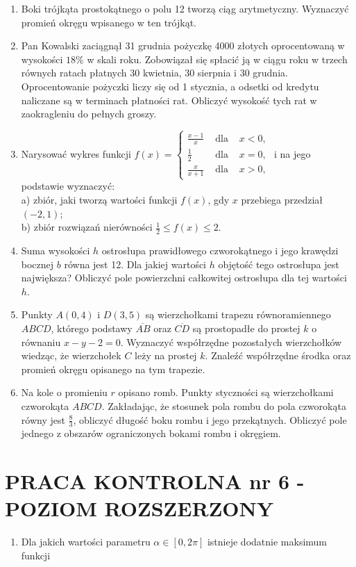 \documentclass[10pt]{article}
\begin{document}
\begin{enumerate}
  \item Boki trójkąta prostokątnego o polu 12 tworzą ciąg arytmetyczny. Wyznaczyć promień okręgu wpisanego w ten trójkąt.
  \item Pan Kowalski zaciągnął 31 grudnia pożyczkę 4000 złotych oprocentowaną w wysokości $18 \%$ w skali roku. Zobowiązał się spłacić ją w ciągu roku w trzech równych ratach płatnych 30 kwietnia, 30 sierpnia i 30 grudnia. Oprocentowanie pożyczki liczy się od 1 stycznia, a odsetki od kredytu naliczane są w terminach płatności rat. Obliczyć wysokość tych rat w zaokragleniu do pełnych groszy.
  \item Narysować wykres funkcji $f(x)=\left\{\begin{array}{ccc}\frac{x-1}{x} & \text { dla } & x<0, \\ \frac{1}{2} & \text { dla } & x=0, \\ \frac{x}{x+1} & \text { dla } & x>0,\end{array}\right.$ i na jego podstawie wyznaczyć:\\
a) zbiór, jaki tworzą wartości funkcji $f(x)$, gdy $x$ przebiega przedział $(-2,1)$;\\
b) zbiór rozwiązań nierówności $\frac{1}{2} \leqslant f(x) \leqslant 2$.
  \item Suma wysokości $h$ ostrosłupa prawidłowego czworokątnego i jego krawędzi bocznej $b$ równa jest 12. Dla jakiej wartości $h$ objętość tego ostrosłupa jest największa? Obliczyć pole powierzchni całkowitej ostrosłupa dla tej wartości $h$.
  \item Punkty $A(0,4)$ i $D(3,5)$ są wierzchołkami trapezu równoramiennego $A B C D$, którego podstawy $\overline{A B}$ oraz $\overline{C D}$ są prostopadłe do prostej $k$ o równaniu $x-y-2=0$. Wyznaczyć współrzędne pozostałych wierzchołków wiedząc, że wierzchołek $C$ leży na prostej $k$. Znaleźć współrzędne środka oraz promień okręgu opisanego na tym trapezie.
  \item Na kole o promieniu $r$ opisano romb. Punkty styczności są wierzchołkami czworokąta $A B C D$. Zakładając, że stosunek pola rombu do pola czworokąta równy jest $\frac{8}{3}$, obliczyć długość boku rombu i jego przekątnych. Obliczyć pole jednego z obszarów ograniczonych bokami rombu i okręgiem.
\end{enumerate}

\section*{PRACA KONTROLNA nr 6 - POZIOM ROZSZERZONY}
\begin{enumerate}
  \item Dla jakich wartości parametru $\alpha \in[0,2 \pi]$ istnieje dodatnie maksimum funkcji
\end{enumerate}
\end{document}
